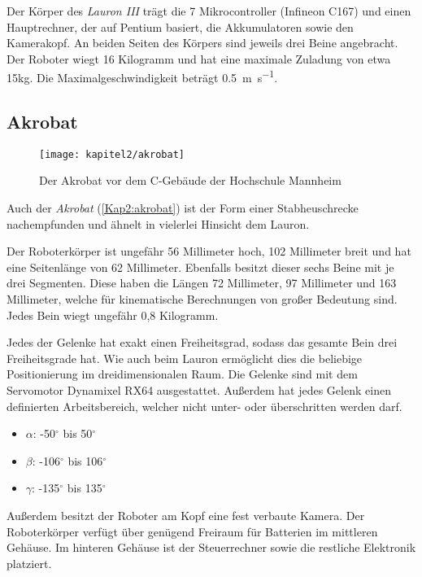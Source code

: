 Der Körper des \emph{Lauron III} trägt die 7 Mikrocontroller (Infineon C167) und einen Hauptrechner, der auf Pentium basiert, die Akkumulatoren sowie den Kamerakopf. An beiden Seiten des Körpers sind jeweils drei Beine angebracht. Der Roboter wiegt 16 Kilogramm und hat eine maximale Zuladung von etwa 15kg. Die Maximalgeschwindigkeit beträgt \SI{0.5}{\metre\per\second}. \autocite{gassmann2000} \autocite{troilo2007}

\subsection{Akrobat}

\begin{figure}[b!]
  \centering
  \texttt{[image: kapitel2/akrobat]}
  \caption{Der Akrobat vor dem C-Gebäude der Hochschule Mannheim}
  \label{Kap2:akrobat}
\end{figure}

Auch der \emph{Akrobat} (\autoref{Kap2:akrobat}) ist der Form einer Stabheuschrecke nachempfunden und ähnelt in vielerlei Hinsicht dem Lauron.

Der Roboterkörper ist ungefähr 56 Millimeter hoch, 102 Millimeter breit und hat eine Seitenlänge von 62 Millimeter. Ebenfalls besitzt dieser sechs Beine mit je drei Segmenten. Diese haben die Längen 72 Millimeter, 97 Millimeter und 163 Millimeter, welche für kinematische Berechnungen von großer Bedeutung sind. Jedes Bein wiegt ungefähr 0,8 Kilogramm.

Jedes der Gelenke hat exakt einen Freiheitsgrad, sodass das gesamte Bein drei Freiheitsgrade hat. Wie auch beim Lauron ermöglicht dies die beliebige Positionierung im dreidimensionalen Raum. Die Gelenke sind mit dem Servomotor Dynamixel RX64 ausgestattet. Außerdem hat jedes Gelenk einen definierten Arbeitsbereich, welcher nicht unter- oder überschritten werden darf.
\begin{itemize}
  \item $\alpha$: -50$^\circ$ bis 50$^\circ$
  \item $\beta$: -106$^\circ$ bis 106$^\circ$
  \item $\gamma$: -135$^\circ$ bis 135$^\circ$
\end{itemize}  

Außerdem besitzt der Roboter am Kopf eine fest verbaute Kamera. Der Roboterkörper verfügt über genügend Freiraum für Batterien im mittleren Gehäuse. Im hinteren Gehäuse ist der Steuerrechner sowie die restliche Elektronik platziert.

